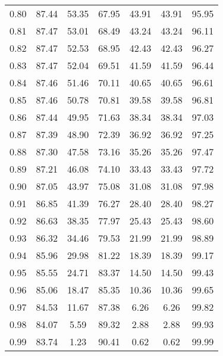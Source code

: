 \begin{tabular}{|c|c|c|c|c|c|c|}
      0.80 &     87.44 &     53.35 &      67.95 &   43.91 &      43.91 &         95.95 \\
      0.81 &     87.47 &     53.01 &      68.49 &   43.24 &      43.24 &         96.11 \\
      0.82 &     87.47 &     52.53 &      68.95 &   42.43 &      42.43 &         96.27 \\
      0.83 &     87.47 &     52.04 &      69.51 &   41.59 &      41.59 &         96.44 \\
      0.84 &     87.46 &     51.46 &      70.11 &   40.65 &      40.65 &         96.61 \\
      0.85 &     87.46 &     50.78 &      70.81 &   39.58 &      39.58 &         96.81 \\
      0.86 &     87.44 &     49.95 &      71.63 &   38.34 &      38.34 &         97.03 \\
      0.87 &     87.39 &     48.90 &      72.39 &   36.92 &      36.92 &         97.25 \\
      0.88 &     87.30 &     47.58 &      73.16 &   35.26 &      35.26 &         97.47 \\
      0.89 &     87.21 &     46.08 &      74.10 &   33.43 &      33.43 &         97.72 \\
      0.90 &     87.05 &     43.97 &      75.08 &   31.08 &      31.08 &         97.98 \\
      0.91 &     86.85 &     41.39 &      76.27 &   28.40 &      28.40 &         98.27 \\
      0.92 &     86.63 &     38.35 &      77.97 &   25.43 &      25.43 &         98.60 \\
      0.93 &     86.32 &     34.46 &      79.53 &   21.99 &      21.99 &         98.89 \\
      0.94 &     85.96 &     29.98 &      81.22 &   18.39 &      18.39 &         99.17 \\
      0.95 &     85.55 &     24.71 &      83.37 &   14.50 &      14.50 &         99.43 \\
      0.96 &     85.06 &     18.47 &      85.35 &   10.36 &      10.36 &         99.65 \\
      0.97 &     84.53 &     11.67 &      87.38 &    6.26 &       6.26 &         99.82 \\
      0.98 &     84.07 &      5.59 &      89.32 &    2.88 &       2.88 &         99.93 \\
      0.99 &     83.74 &      1.23 &      90.41 &    0.62 &       0.62 &         99.99 \\
\bottomrule
\end{tabular}
